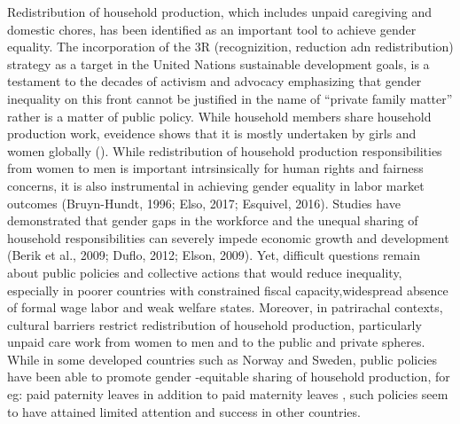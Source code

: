 \documentclass[
  11pt,
]{article}
\begin{document}
Redistribution of household production, which includes unpaid caregiving
and domestic chores, has been identified as an important tool to achieve
gender equality. The incorporation of the 3R (recognizition, reduction
adn redistribution) strategy as a target in the United Nations
sustainable development goals, is a testament to the decades of activism
and advocacy emphasizing that gender inequality on this front cannot be
justified in the name of ``private family matter'' rather is a matter of
public policy. While household members share household production work,
eveidence shows that it is mostly undertaken by girls and women globally
(). While redistribution of household production responsibilities from
women to men is important intrsinsically for human rights and fairness
concerns, it is also instrumental in achieving gender equality in labor
market outcomes (Bruyn-Hundt, 1996; Elso, 2017; Esquivel, 2016). Studies
have demonstrated that gender gaps in the workforce and the unequal
sharing of household responsibilities can severely impede economic
growth and development (Berik et al., 2009; Duflo, 2012; Elson, 2009).
Yet, difficult questions remain about public policies and collective
actions that would reduce inequality, especially in poorer countries
with constrained fiscal capacity,widespread absence of formal wage labor
and weak welfare states. Moreover, in patrirachal contexts, cultural
barriers restrict redistribution of household production, particularly
unpaid care work from women to men and to the public and private
spheres. While in some developed countries such as Norway and Sweden,
public policies have been able to promote gender -equitable sharing of
household production, for eg: paid paternity leaves in addition to paid
maternity leaves , such policies seem to have attained limited attention
and success in other countries.
\end{document}
